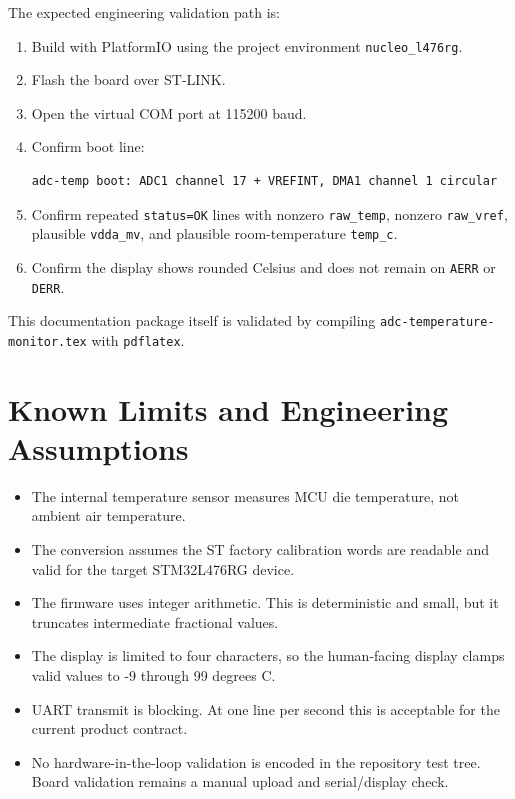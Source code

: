 \documentclass[11pt,a4paper]{article}
\begin{document}
The expected engineering validation path is:

\begin{enumerate}[leftmargin=*]
  \item Build with PlatformIO using the project environment
        \texttt{nucleo\_l476rg}.
  \item Flash the board over ST-LINK.
  \item Open the virtual COM port at 115200 baud.
  \item Confirm boot line:
\begin{lstlisting}
adc-temp boot: ADC1 channel 17 + VREFINT, DMA1 channel 1 circular
\end{lstlisting}
  \item Confirm repeated \texttt{status=OK} lines with nonzero
        \texttt{raw\_temp}, nonzero \texttt{raw\_vref}, plausible
        \texttt{vdda\_mv}, and plausible room-temperature \texttt{temp\_c}.
  \item Confirm the display shows rounded Celsius and does not remain on
        \texttt{AERR} or \texttt{DERR}.
\end{enumerate}

This documentation package itself is validated by compiling
\texttt{adc-temperature-monitor.tex} with \texttt{pdflatex}.

\section{Known Limits and Engineering Assumptions}

\begin{itemize}[leftmargin=*]
  \item The internal temperature sensor measures MCU die temperature, not ambient
        air temperature.
  \item The conversion assumes the ST factory calibration words are readable and
        valid for the target STM32L476RG device.
  \item The firmware uses integer arithmetic. This is deterministic and small,
        but it truncates intermediate fractional values.
  \item The display is limited to four characters, so the human-facing display
        clamps valid values to -9 through 99 degrees C.
  \item UART transmit is blocking. At one line per second this is acceptable for
        the current product contract.
  \item No hardware-in-the-loop validation is encoded in the repository test
        tree. Board validation remains a manual upload and serial/display check.
\end{itemize}
\end{document}
